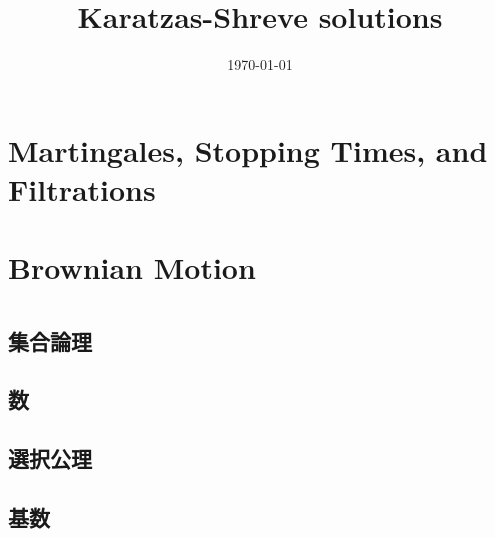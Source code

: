 \documentclass[a4j,10.5pt,oneside,openany]{jsbook}
\title{Karatzas-Shreve solutions}
\author{}
\date{\today}
\theoremstyle{mystyle}
\begin{document}
%
%
\maketitle
%
%
\tableofcontents
\frontmatter
%
\mainmatter
%
\chapter{Martingales, Stopping Times, and Filtrations}








\chapter{Brownian Motion}






\appendix
\chapter{}
\section{集合論理}
	
	
	
	
	
	
	
	
	
\section{数}
	
	
	
	
	
	
	
\section{選択公理}
	
\section{基数}
	
	
\end{document}
